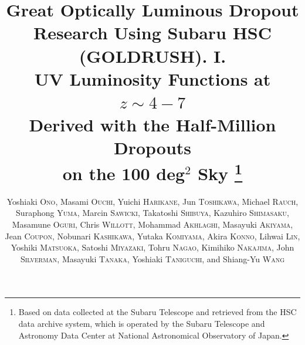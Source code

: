 \documentclass[]{pasj01}
\begin{document}
 

\title{Great Optically Luminous Dropout Research Using Subaru HSC (GOLDRUSH). I. \\ 
UV Luminosity Functions at $z \sim 4-7$\\ 
Derived with the Half-Million Dropouts \\
on the 100 deg$^2$ Sky
\thanks{Based on data collected at the Subaru Telescope 
and retrieved from the HSC data archive system, 
which is operated by the Subaru Telescope 
and Astronomy Data Center at National Astronomical Observatory of Japan.}
}

\author{
Yoshiaki \textsc{Ono}, 
Masami \textsc{Ouchi}, 
Yuichi \textsc{Harikane}, 
Jun \textsc{Toshikawa}, 
Michael \textsc{Rauch}, 
Suraphong \textsc{Yuma}, 
Marcin \textsc{Sawicki}, 
Takatoshi \textsc{Shibuya}, 
Kazuhiro \textsc{Shimasaku}, 
Masamune \textsc{Oguri}, 
Chris \textsc{Willott}, 
Mohammad \textsc{Akhlaghi}, 
Masayuki \textsc{Akiyama}, 
Jean \textsc{Coupon}, 
Nobunari \textsc{Kashikawa}, 
Yutaka \textsc{Komiyama}, 
Akira \textsc{Konno}, 
Lihwai \textsc{Lin}, 
Yoshiki \textsc{Matsuoka}, 
Satoshi \textsc{Miyazaki}, 
Tohru \textsc{Nagao}, 
Kimihiko \textsc{Nakajima}, 
John \textsc{Silverman}, 
Masayuki \textsc{Tanaka}, 
Yoshiaki \textsc{Taniguchi}, 
and 
Shiang-Yu \textsc{Wang} 
}
\end{document}
